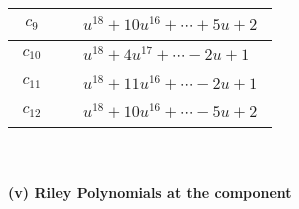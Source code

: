 \documentclass[1p]{elsarticle_modified}
\theoremstyle{definition}
\begin{document}
\begin{tabular}{m{50pt}|m{274pt}}
\hline $$\begin{aligned}c_{9}\end{aligned}$$&$\begin{aligned}
&u^{18}+10 u^{16}+\cdots+5 u+2
\end{aligned}$\\
\hline $$\begin{aligned}c_{10}\end{aligned}$$&$\begin{aligned}
&u^{18}+4 u^{17}+\cdots-2 u+1
\end{aligned}$\\
\hline $$\begin{aligned}c_{11}\end{aligned}$$&$\begin{aligned}
&u^{18}+11 u^{16}+\cdots-2 u+1
\end{aligned}$\\
\hline $$\begin{aligned}c_{12}\end{aligned}$$&$\begin{aligned}
&u^{18}+10 u^{16}+\cdots-5 u+2
\end{aligned}$\\
\hline
\end{tabular}\\~\\
\newpage\renewcommand{\arraystretch}{1}
\flushleft \textbf{(v) Riley Polynomials at the component}\newline \\
\end{document}
